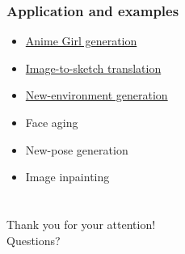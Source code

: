 \begin{frame}
\frametitle{Application and examples}
\begin{itemize}
	\item \href{https://make.girls.moe/}{Anime Girl generation}
	\item \href{D:/Python_scripts/pytorch-CycleGAN-and-pix2pix-master/results/feret_sketch_my/test_latest/index.html}{Image-to-sketch translation}
	\item \href{http://gandissect.res.ibm.com/ganpaint.html?project=churchoutdoor&layer=layer4}{New-environment generation}
	\item Face aging
	\item New-pose generation
	\item Image inpainting 
\end{itemize}
\end{frame}




\section[]{}
\begin{frame}
	\begin{center}
		\Huge{Thank you for your attention!} \\
		\bigskip
		\Huge{Questions?}
	\end{center}
\end{frame}




